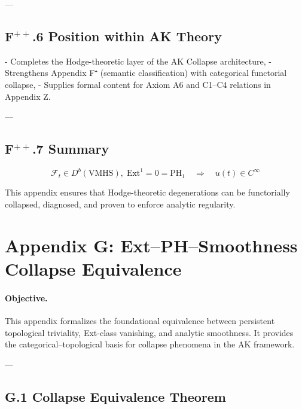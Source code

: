 \documentclass[11pt]{article}
\begin{document}
---

\subsection*{F$^{++}$.6 Position within AK Theory}

- Completes the Hodge-theoretic layer of the AK Collapse architecture,
- Strengthens Appendix F⁺ (semantic classification) with categorical functorial collapse,
- Supplies formal content for Axiom A6 and C1–C4 relations in Appendix Z.

---

\subsection*{F$^{++}$.7 Summary}

\[
\boxed{
\mathcal{F}_t \in D^b(\mathrm{VMHS}),
\;
\mathrm{Ext}^1 = 0 = \mathrm{PH}_1
\quad \Rightarrow \quad
u(t) \in C^\infty
}
\]

This appendix ensures that Hodge-theoretic degenerations can be functorially collapsed,  
diagnosed, and proven to enforce analytic regularity.






\section*{Appendix G: Ext–PH–Smoothness Collapse Equivalence}

\paragraph{Objective.}  
This appendix formalizes the foundational equivalence between persistent topological triviality, Ext-class vanishing, and analytic smoothness.  
It provides the categorical–topological basis for collapse phenomena in the AK framework.

---

\subsection*{G.1 Collapse Equivalence Theorem}
\end{document}
